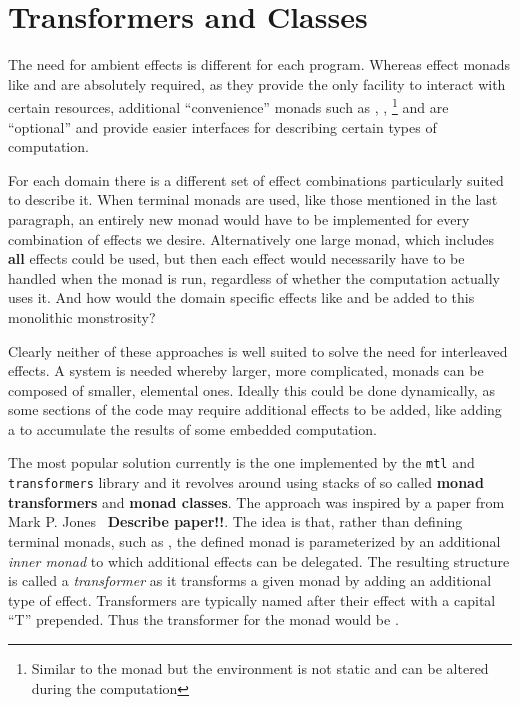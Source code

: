 \section{Transformers and Classes}

\label{sec:transformers}

The need for ambient effects is different for each program. Whereas
effect monads like \IOM{} and \HandlerForM{} are absolutely required,
as they provide the only facility to interact with certain resources,
additional ``convenience'' monads such as \ReaderM{}, \WriterM{},
\StateM{}\footnote{Similar to the \ReaderM{} monad but the environment
  is not static and can be altered during the computation} and
\ExceptM{} are ``optional'' and provide easier interfaces for
describing certain types of computation.

For each domain there is a different set of effect combinations
particularly suited to describe it. When terminal monads are used,
like those mentioned in the last paragraph, an entirely new monad
would have to be implemented for every combination of effects we
desire. Alternatively one large monad, which includes \textbf{all}
effects could be used, but then each effect would necessarily have to
be handled when the monad is run, regardless of whether the
computation actually uses it. And how would the domain specific
effects like \IOM{} and \HandlerForM{} be added to this monolithic
monstrosity?

Clearly neither of these approaches is well suited to solve the need
for interleaved effects. A system is needed whereby larger, more
complicated, monads can be composed of smaller, elemental
ones. Ideally this could be done dynamically, as some sections of the
code may require additional effects to be added, like adding a
\WriterM{} to accumulate the results of some embedded computation.

The most popular solution currently is the one implemented by the
\texttt{mtl}\cite{mtl} and \texttt{transformers}\cite{transformers}
library and it revolves around using stacks of so called \textbf{monad
  transformers} and \textbf{monad classes}. The approach was inspired
by a paper from Mark P. Jones~\cite{transformer-inspiration}
\textbf{Describe paper!!}. The idea is that, rather than defining
terminal monads, such as \ReaderM{}, the defined monad is
parameterized by an additional \emph{inner monad} to which additional
effects can be delegated. The resulting structure is called a
\emph{transformer} as it transforms a given monad by adding an
additional type of effect. Transformers are typically named after
their effect with a capital ``T'' prepended. Thus the transformer for
the \ReaderM{} monad would be \ReaderT{}.

